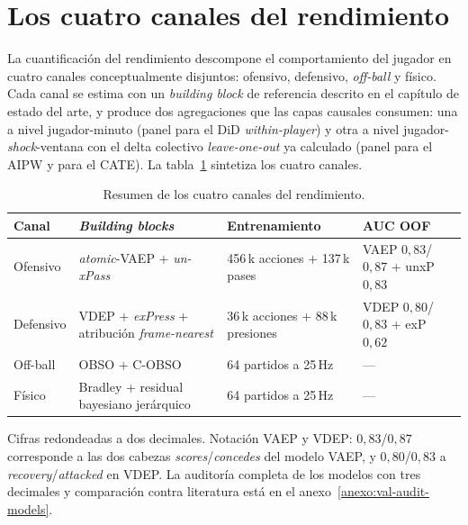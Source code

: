 \section{Los cuatro canales del rendimiento}
\label{sec:canales}

La cuantificación del rendimiento descompone el comportamiento del
jugador en cuatro canales conceptualmente disjuntos: ofensivo,
defensivo, \textit{off-ball} y físico. Cada canal se estima con un
\textit{building block} de referencia descrito en el capítulo de
estado del arte, y produce dos agregaciones que las capas causales
consumen: una a nivel jugador-minuto (panel para el DiD
\textit{within-player}) y otra a nivel jugador-\textit{shock}-ventana
con el delta colectivo \textit{leave-one-out} ya calculado (panel
para el AIPW y para el CATE). La tabla~\ref{tab:canales-resumen}
sintetiza los cuatro canales.

\begin{table}[h]
  \centering
  \footnotesize
  \caption{Resumen de los cuatro canales del rendimiento.}
  \label{tab:canales-resumen}
  \begin{tabular}{@{}lp{4.4cm}p{3.4cm}l@{}}
    \toprule
    Canal & \textit{Building blocks} & Entrenamiento & AUC OOF \\
    \midrule
    Ofensivo  & \textit{atomic}-VAEP + \textit{un-xPass} & 456\,k acciones + 137\,k pases & VAEP $0{,}83$/$0{,}87$ + unxP $0{,}83$ \\
    Defensivo & VDEP + \textit{exPress} + atribución \textit{frame-nearest} & 36\,k acciones + 88\,k presiones & VDEP $0{,}80$/$0{,}83$ + exP $0{,}62$ \\
    Off-ball  & OBSO + C-OBSO & 64 partidos a 25\,Hz & --- \\
    Físico    & Bradley + residual bayesiano jerárquico & 64 partidos a 25\,Hz & --- \\
    \bottomrule
  \end{tabular}

  \vspace{0.3em}
  \footnotesize Cifras redondeadas a dos decimales. Notación VAEP y
  VDEP: $0{,}83$/$0{,}87$ corresponde a las dos cabezas
  \textit{scores}/\textit{concedes} del modelo VAEP, y $0{,}80$/$0{,}83$
  a \textit{recovery}/\textit{attacked} en VDEP. La auditoría
  completa de los modelos con tres decimales y comparación contra
  literatura está en el anexo~\ref{anexo:val-audit-models}.
\end{table}


